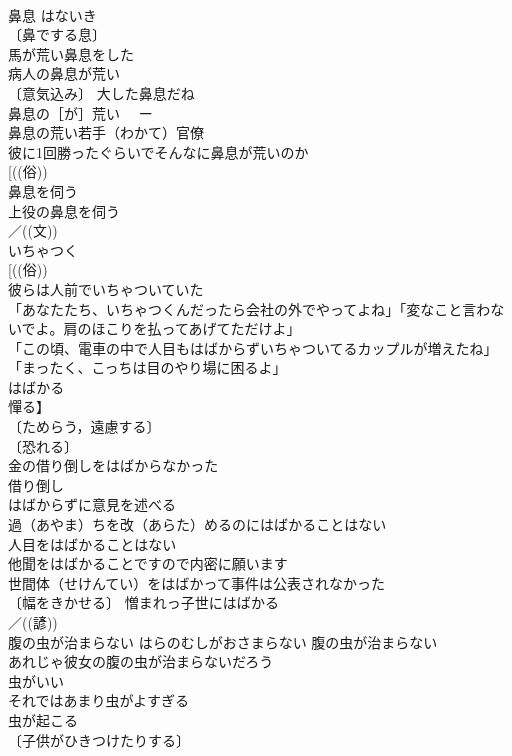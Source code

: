 \documentclass[8pt]{extreport}
\begin{document}
\begin{CJK}{UTF8}{min}
\\	鼻息	はないき	
\\	〔鼻でする息〕
\\	馬が荒い鼻息をした 
\\	病人の鼻息が荒い 
\\	〔意気込み〕 大した鼻息だね 
\\	鼻息の［が］荒い　 ー
\\	鼻息の荒い若手（わかて）官僚 
\\	彼に1回勝ったぐらいでそんなに鼻息が荒いのか 
\\	[((俗))
\\	鼻息を伺う　 
\\	上役の鼻息を伺う 
\\	／((文))
\\	いちゃつく		
\\	[((俗)) 
\\	彼らは人前でいちゃついていた 
\\	「あなたたち、いちゃつくんだったら会社の外でやってよね」「変なこと言わないでよ。肩のほこりを払ってあげてただけよ」 
\\	「この頃、電車の中で人目もはばからずいちゃついてるカップルが増えたね」「まったく、こっちは目のやり場に困るよ」 
\\	はばかる	
\\	憚る】	
\\	〔ためらう，遠慮する〕
\\	〔恐れる〕
\\	金の借り倒しをはばからなかった
\\	借り倒し　
\\	はばからずに意見を述べる 
\\	過（あやま）ちを改（あらた）めるのにはばかることはない 
\\	人目をはばかることはない 
\\	他聞をはばかることですので内密に願います 
\\	世間体（せけんてい）をはばかって事件は公表されなかった 
\\	〔幅をきかせる〕 憎まれっ子世にはばかる 
\\	／((諺)) 
\\	腹の虫が治まらない	はらのむしがおさまらない	腹の虫が治まらない 
\\	あれじゃ彼女の腹の虫が治まらないだろう 
\\	虫がいい		
\\	それではあまり虫がよすぎる 
\\	虫が起こる		
\\	〔子供がひきつけたりする〕

\end{CJK}
\end{document}
